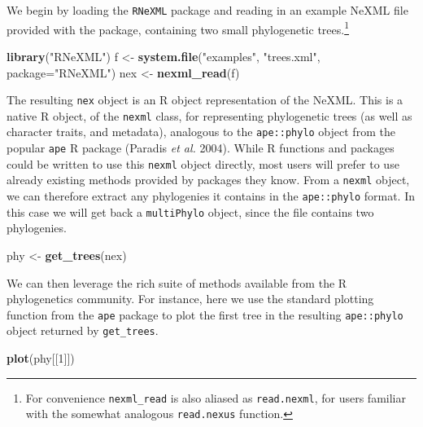 \documentclass[author-year, review, 11pt]{components/elsarticle} %
\newenvironment{Shaded}{\begin{snugshade}}{\end{snugshade}}
\newcommand{\KeywordTok}[1]{\textcolor[rgb]{0.13,0.29,0.53}{\textbf{{#1}}}}
\newcommand{\DataTypeTok}[1]{\textcolor[rgb]{0.13,0.29,0.53}{{#1}}}
\newcommand{\DecValTok}[1]{\textcolor[rgb]{0.00,0.00,0.81}{{#1}}}
\newcommand{\StringTok}[1]{\textcolor[rgb]{0.31,0.60,0.02}{{#1}}}
\newcommand{\NormalTok}[1]{{#1}}
\begin{document}
We begin by loading the \texttt{RNeXML} package and reading in an
example NeXML file provided with the package, containing two small
phylogenetic trees.\footnote{For convenience \texttt{nexml\_read} is
  also aliased as \texttt{read.nexml}, for users familiar with the
  somewhat analogous \texttt{read.nexus} function.}

\begin{Shaded}
\begin{Highlighting}[]
\KeywordTok{library}\NormalTok{(}\StringTok{"RNeXML"}\NormalTok{)}
\NormalTok{f <-}\StringTok{ }\KeywordTok{system.file}\NormalTok{(}\StringTok{"examples"}\NormalTok{, }\StringTok{"trees.xml"}\NormalTok{, }\DataTypeTok{package=}\StringTok{"RNeXML"}\NormalTok{)}
\NormalTok{nex <-}\StringTok{ }\KeywordTok{nexml_read}\NormalTok{(f)}
\end{Highlighting}
\end{Shaded}

The resulting \texttt{nex} object is an R object representation of the
NeXML. This is a native R object, of the \texttt{nexml} class, for
representing phylogenetic trees (as well as character traits, and
metadata), analogous to the \texttt{ape::phylo} object from the popular
\texttt{ape} R package (Paradis \emph{et al.} 2004). While R functions
and packages could be written to use this \texttt{nexml} object
directly, most users will prefer to use already existing methods
provided by packages they know. From a \texttt{nexml} object, we can
therefore extract any phylogenies it contains in the \texttt{ape::phylo}
format. In this case we will get back a \texttt{multiPhylo} object,
since the file contains two phylogenies.

\begin{Shaded}
\begin{Highlighting}[]
\NormalTok{phy <-}\StringTok{ }\KeywordTok{get_trees}\NormalTok{(nex)}
\end{Highlighting}
\end{Shaded}

We can then leverage the rich suite of methods available from the R
phylogenetics community. For instance, here we use the standard plotting
function from the \texttt{ape} package to plot the first tree in the
resulting \texttt{ape::phylo} object returned by \texttt{get\_trees}.

\begin{Shaded}
\begin{Highlighting}[]
\KeywordTok{plot}\NormalTok{(phy[[}\DecValTok{1}\NormalTok{]])}
\end{Highlighting}
\end{Shaded}
\end{document}
